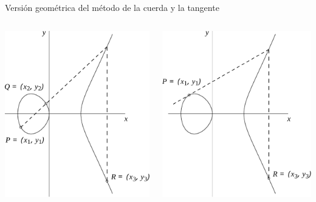 \documentclass[aspectratio=43,10pt,spanish]{beamer}
\theoremstyle{definition} %
\begin{document}
\begin{frame}{Versión geométrica del método de la cuerda y la tangente}
        \begin{columns}[T,onlytextwidth]
            \begin{center}
                \includegraphics[width=0.8\linewidth]{Graficos/ejemplo_adiccion.pdf}
            \end{center}

            \begin{center}
                \includegraphics[width=0.8\linewidth]{Graficos/ejemplo_duplicacion.pdf}
            \end{center}
        \end{columns}


\end{frame}
\end{document}
